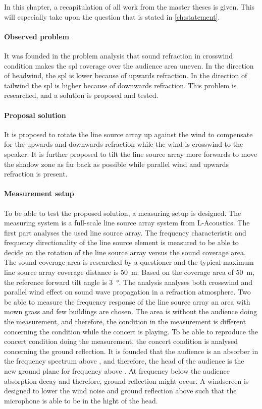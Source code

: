 In this chapter, a recapitulation of all work from the master theses is given. This will especially take upon the question that is stated in \autoref{ch:statement}.

\paragraph{Observed problem}
It was founded in the problem analysis that sound refraction in crosswind condition makes the \gls{spl} coverage over the audience area uneven. In the direction of headwind, the \gls{spl} is lower because of upwards refraction. In the direction of tailwind the \gls{spl} is higher because of downwards refraction.  This problem is researched, and a solution is proposed and tested.


\paragraph{Proposal solution}
It is proposed to rotate the line source array up against the wind to compensate for the upwards and downwards refraction while the wind is crosswind to the speaker. It is further proposed to tilt the line source array more forwards to move the shadow zone as far back as possible while parallel wind and upwards refraction is present. 

\paragraph{Measurement setup}
To be able to test the proposed solution, a measuring setup is designed. The measuring system is a full-scale line source array system from L-Acoustics. The first part analyses the used line source array. The frequency characteristic and frequency directionality of the line source element is measured to be able to decide on the rotation of the line source array versus the sound coverage area. The sound coverage area is researched by a questioner and the typical maximum line source array coverage distance is \SI{50}{\meter}. Based on the coverage area of \SI{50}{\meter}, the reference forward tilt angle is \SI{3}{\degree}. The analysis analyses both crosswind and parallel wind effect on sound wave propagation in a refraction atmosphere. Two be able to measure the frequency response of the line source array an area with mown grass and few buildings are chosen. The area is without the audience doing the measurement, and therefore, the condition in the measurement is different concerning the condition while the concert is playing. To be able to reproduce the concert condition doing the measurement, the concert condition is analysed concerning the ground reflection. It is founded that the audience is an absorber in the frequency spectrum above , and therefore, the head of the audience is the new ground plane for frequency above . At frequency below the audience absorption decay and therefore, ground reflection might occur. A windscreen is designed to lower the wind noise and ground reflection above  such that the microphone is able to be in the hight of the head. 

